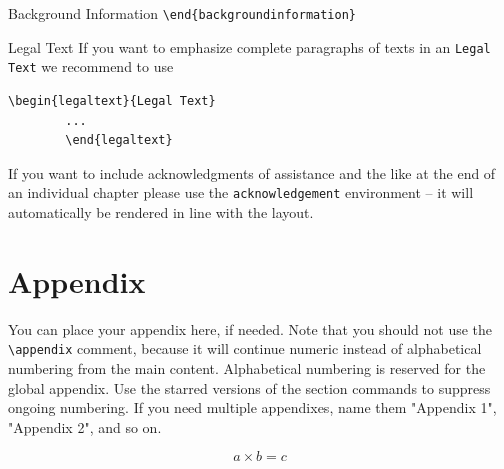 \begin{bibunit}
\begin{backgroundinformation}{Background Information}
		\verb|\end{backgroundinformation}|
	\end{backgroundinformation}
	\begin{legaltext}{Legal Text}
		If you want to emphasize complete paragraphs of texts in an \verb|Legal Text| we recommend to
		use  \begin{verbatim}\begin{legaltext}{Legal Text}
		...
		\end{legaltext}\end{verbatim}
	\end{legaltext}
	\begin{acknowledgement}
		If you want to include acknowledgments of assistance and the like at the end of an individual chapter please use the \verb|acknowledgement| environment -- it will automatically be rendered in line with the layout.
	\end{acknowledgement}
	
	\section*{Appendix}\label{appendix}
	
	You can place your appendix here, if needed. Note that you should not use the \verb|\appendix| comment, because it will continue numeric instead of alphabetical numbering from the main content. Alphabetical numbering is reserved for the global appendix. Use the starred versions of the section commands to suppress ongoing numbering. If you need multiple appendixes, name them "Appendix 1", "Appendix 2", and so on.
	
	\begin{equation}
	a \times b = c
	\end{equation}
	
	
	
	

	
\end{bibunit}
	
%